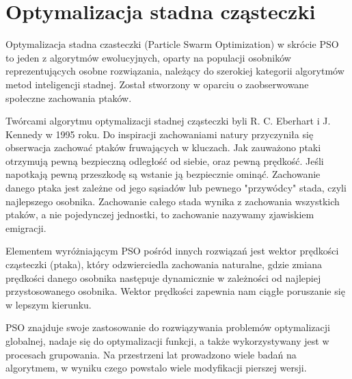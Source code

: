 \documentclass[twoside]{pracaMagisterskaMS}
\begin{document}
\section{Optymalizacja stadna cząsteczki} %
Optymalizacja stadna czasteczki (Particle Swarm Optimization) w skrócie PSO to jeden z algorytmów ewolucyjnych, oparty na populacji osobników reprezentujących osobne rozwiązania, należący do szerokiej kategorii algorytmów metod inteligencji stadnej. Został stworzony w oparciu o zaobserwowane społeczne zachowania ptaków. 

Twórcami algorytmu optymalizacji stadnej cząsteczki byli R. C. Eberhart i J. Kennedy w 1995 roku. Do inspiracji zachowaniami natury przyczyniła się obserwacja zachować ptaków fruwających w kluczach. Jak zauważono ptaki otrzymują pewną bezpieczną odległość od siebie, oraz pewną prędkość. Jeśli napotkają pewną przeszkodę są wstanie ją bezpiecznie ominąć. Zachowanie danego ptaka jest zależne od jego sąsiadów lub pewnego "przywódcy" stada, czyli najlepszego osobnika.
Zachowanie całego stada wynika z zachowania wszystkich ptaków, a nie pojedynczej jednostki, to zachowanie nazywamy zjawiskiem emigracji. 

Elementem wyróżniającym PSO pośród innych rozwiązań jest wektor prędkości cząsteczki (ptaka), który odzwierciedla zachowania naturalne, gdzie zmiana prędkości danego osobnika następuje dynamicznie w zależności od najlepiej przystosowanego osobnika. Wektor prędkości zapewnia nam ciągłe poruszanie się w lepszym kierunku.

PSO znajduje swoje zastosowanie do rozwiązywania problemów optymalizacji globalnej, nadaje się do optymalizacji funkcji, a także wykorzystywany jest w procesach grupowania.
Na przestrzeni lat prowadzono wiele badań na algorytmem, w wyniku czego powstalo wiele modyfikacji pierszej wersji.
	
\end{document}
